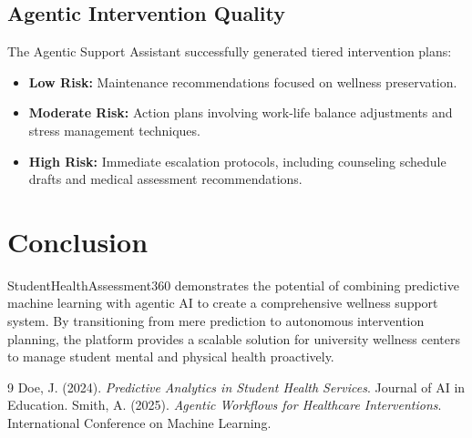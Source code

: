 \documentclass[12pt,a4paper]{article}
\begin{document}
\subsection{Agentic Intervention Quality}
The Agentic Support Assistant successfully generated tiered intervention plans:
\begin{itemize}
    \item \textbf{Low Risk:} Maintenance recommendations focused on wellness preservation.
    \item \textbf{Moderate Risk:} Action plans involving work-life balance adjustments and stress management techniques.
    \item \textbf{High Risk:} Immediate escalation protocols, including counseling schedule drafts and medical assessment recommendations.
\end{itemize}

\section{Conclusion}
StudentHealthAssessment360 demonstrates the potential of combining predictive machine learning with agentic AI to create a comprehensive wellness support system. By transitioning from mere prediction to autonomous intervention planning, the platform provides a scalable solution for university wellness centers to manage student mental and physical health proactively.

\begin{thebibliography}{9}
Doe, J. (2024). \textit{Predictive Analytics in Student Health Services}. Journal of AI in Education.
Smith, A. (2025). \textit{Agentic Workflows for Healthcare Interventions}. International Conference on Machine Learning.
\end{thebibliography}
\end{document}
